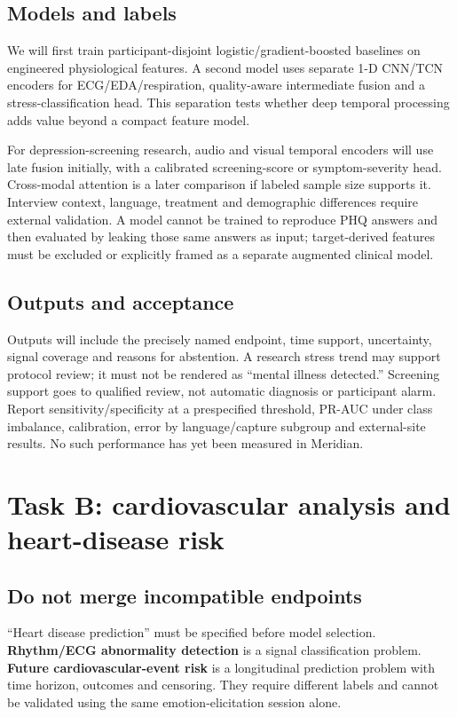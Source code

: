 \documentclass[11pt,a4paper]{article}
\begin{document}
\subsection{Models and labels}
We will first train participant-disjoint logistic/gradient-boosted baselines on engineered physiological features. A second model uses separate 1-D CNN/TCN encoders for ECG/EDA/respiration, quality-aware intermediate fusion and a stress-classification head. This separation tests whether deep temporal processing adds value beyond a compact feature model.

For depression-screening research, audio and visual temporal encoders will use late fusion initially, with a calibrated screening-score or symptom-severity head. Cross-modal attention is a later comparison if labeled sample size supports it. Interview context, language, treatment and demographic differences require external validation. A model cannot be trained to reproduce PHQ answers and then evaluated by leaking those same answers as input; target-derived features must be excluded or explicitly framed as a separate augmented clinical model.

\subsection{Outputs and acceptance}
Outputs will include the precisely named endpoint, time support, uncertainty, signal coverage and reasons for abstention. A research stress trend may support protocol review; it must not be rendered as ``mental illness detected.'' Screening support goes to qualified review, not automatic diagnosis or participant alarm. Report sensitivity/specificity at a prespecified threshold, PR-AUC under class imbalance, calibration, error by language/capture subgroup and external-site results. No such performance has yet been measured in Meridian.

\section{Task B: cardiovascular analysis and heart-disease risk}
\subsection{Do not merge incompatible endpoints}
``Heart disease prediction'' must be specified before model selection. \textbf{Rhythm/ECG abnormality detection} is a signal classification problem. \textbf{Future cardiovascular-event risk} is a longitudinal prediction problem with time horizon, outcomes and censoring. They require different labels and cannot be validated using the same emotion-elicitation session alone.
\end{document}
